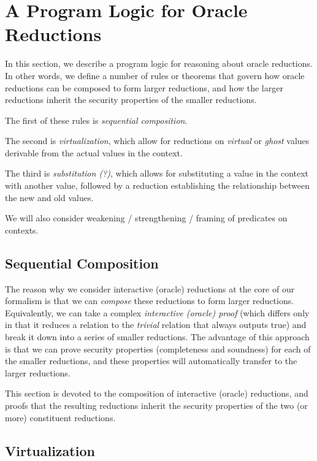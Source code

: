 
\section{A Program Logic for Oracle Reductions}

In this section, we describe a program logic for reasoning about oracle reductions. In other words, we define a number of rules or theorems that govern how oracle reductions can be composed to form larger reductions, and how the larger reductions inherit the security properties of the smaller reductions.

The first of these rules is \emph{sequential composition}.

The second is \emph{virtualization}, which allow for reductions on \emph{virtual} or \emph{ghost} values derivable from the actual values in the context.

The third is \emph{substitution (?)}, which allows for substituting a value in the context with another value, followed by a reduction establishing the relationship between the new and old values.

We will also consider weakening / strengthening / framing of predicates on contexts.

\subsection{Sequential Composition}

The reason why we consider interactive (oracle) reductions at the core of our formalism is that we can \emph{compose} these reductions to form larger reductions. Equivalently, we can take a complex \emph{interactive (oracle) proof} (which differs only in that it reduces a relation to the \emph{trivial} relation that always outputs true) and break it down into a series of smaller reductions. The advantage of this approach is that we can prove security properties (completeness and soundness) for each of the smaller reductions, and these properties will automatically transfer to the larger reductions.

This section is devoted to the composition of interactive (oracle) reductions, and proofs that the resulting reductions inherit the security properties of the two (or more) constituent reductions.

\subsection{Virtualization}

